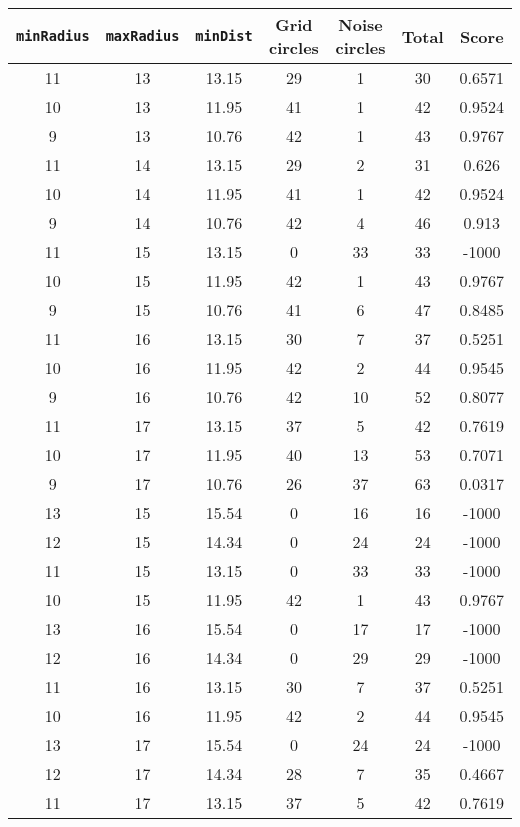 \documentclass[letterpaper, 12pt]{article}
\begin{document}
\begin{longtable}{|c|c|c|c|c|c|c|}
\hline
\textbf{\texttt{minRadius}} & \textbf{\texttt{maxRadius}} & \textbf{\texttt{minDist}} & \textbf{Grid circles} & \textbf{Noise circles} & \textbf{Total} & \textbf{Score} \\
\hline
11 & 13 & 13.15 & 29 & 1 & 30 & 0.6571 \\
\hline
10 & 13 & 11.95 & 41 & 1 & 42 & 0.9524 \\
\hline
9 & 13 & 10.76 & 42 & 1 & 43 & 0.9767 \\
\hline
11 & 14 & 13.15 & 29 & 2 & 31 & 0.626 \\
\hline
10 & 14 & 11.95 & 41 & 1 & 42 & 0.9524 \\
\hline
9 & 14 & 10.76 & 42 & 4 & 46 & 0.913 \\
\hline
11 & 15 & 13.15 & 0 & 33 & 33 & -1000 \\
\hline
10 & 15 & 11.95 & 42 & 1 & 43 & 0.9767 \\
\hline
9 & 15 & 10.76 & 41 & 6 & 47 & 0.8485 \\
\hline
11 & 16 & 13.15 & 30 & 7 & 37 & 0.5251 \\
\hline
10 & 16 & 11.95 & 42 & 2 & 44 & 0.9545 \\
\hline
9 & 16 & 10.76 & 42 & 10 & 52 & 0.8077 \\
\hline
11 & 17 & 13.15 & 37 & 5 & 42 & 0.7619 \\
\hline
10 & 17 & 11.95 & 40 & 13 & 53 & 0.7071 \\
\hline
9 & 17 & 10.76 & 26 & 37 & 63 & 0.0317 \\
\hline
13 & 15 & 15.54 & 0 & 16 & 16 & -1000 \\
\hline
12 & 15 & 14.34 & 0 & 24 & 24 & -1000 \\
\hline
11 & 15 & 13.15 & 0 & 33 & 33 & -1000 \\
\hline
10 & 15 & 11.95 & 42 & 1 & 43 & 0.9767 \\
\hline
13 & 16 & 15.54 & 0 & 17 & 17 & -1000 \\
\hline
12 & 16 & 14.34 & 0 & 29 & 29 & -1000 \\
\hline
11 & 16 & 13.15 & 30 & 7 & 37 & 0.5251 \\
\hline
10 & 16 & 11.95 & 42 & 2 & 44 & 0.9545 \\
\hline
13 & 17 & 15.54 & 0 & 24 & 24 & -1000 \\
\hline
12 & 17 & 14.34 & 28 & 7 & 35 & 0.4667 \\
\hline
11 & 17 & 13.15 & 37 & 5 & 42 & 0.7619 \\
\hline

\end{longtable}
\end{document}
